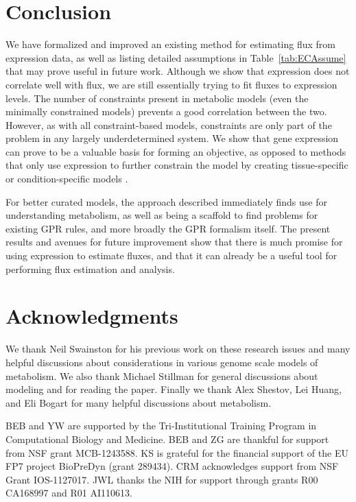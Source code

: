 %
%


\section{Conclusion}

We have formalized and improved an existing method for estimating flux
from expression data, as well as listing detailed assumptions in
\suppOrApp Table~\ref{tab:ECAssume} that may prove useful in future
work. Although we show that expression does not correlate well with
flux, we are still essentially trying to fit fluxes to expression
levels.  The number of constraints present in metabolic models (even
the minimally constrained models) prevents a good correlation between
the two. However, as with all constraint-based models, constraints are
only part of the problem in any largely underdetermined system. We
show that gene expression can prove to be a valuable basis for forming
an objective, as opposed to methods that only use expression to
further constrain the model by creating tissue-specific or
condition-specific models \citep{Shlomi2008,Becker2008,Gowen2010}.

For better curated models, the approach described immediately finds
use for understanding metabolism, as well as being a scaffold to find
problems for existing GPR rules, and more broadly the GPR formalism itself.
The present results and avenues for future improvement
show that there is much promise for using expression to estimate
fluxes, and that it can already be a useful tool for performing flux
estimation and analysis.

\section{Acknowledgments}
We thank Neil Swainston for his previous work on these research issues
and many helpful discussions about considerations in various genome
scale models of metabolism.  We also thank Michael Stillman for
general discussions about modeling and for reading the paper. Finally
we thank Alex Shestov, Lei Huang, and Eli Bogart for many helpful
discussions about metabolism.

BEB and YW are supported by the Tri-Institutional Training Program in
Computational Biology and Medicine. BEB and ZG are thankful for
support from NSF grant MCB-1243588.  KS is grateful for the financial
support of the EU FP7 project BioPreDyn (grant 289434). CRM
acknowledges support from NSF Grant IOS-1127017. JWL thanks the NIH
for support through grants R00 CA168997 and R01 AI110613.
